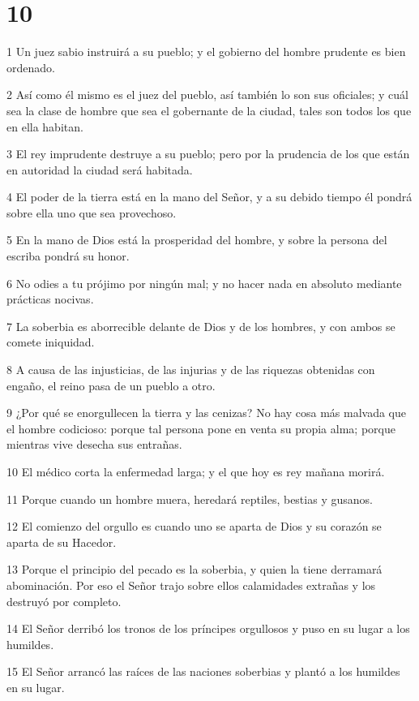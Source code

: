 \chapter{10}

\par 1 Un juez sabio instruirá a su pueblo; y el gobierno del hombre prudente es bien ordenado.
\par 2 Así como él mismo es el juez del pueblo, así también lo son sus oficiales; y cuál sea la clase de hombre que sea el gobernante de la ciudad, tales son todos los que en ella habitan.
\par 3 El rey imprudente destruye a su pueblo; pero por la prudencia de los que están en autoridad la ciudad será habitada.
\par 4 El poder de la tierra está en la mano del Señor, y a su debido tiempo él pondrá sobre ella uno que sea provechoso.
\par 5 En la mano de Dios está la prosperidad del hombre, y sobre la persona del escriba pondrá su honor.
\par 6 No odies a tu prójimo por ningún mal; y no hacer nada en absoluto mediante prácticas nocivas.
\par 7 La soberbia es aborrecible delante de Dios y de los hombres, y con ambos se comete iniquidad.
\par 8 A causa de las injusticias, de las injurias y de las riquezas obtenidas con engaño, el reino pasa de un pueblo a otro.
\par 9 ¿Por qué se enorgullecen la tierra y las cenizas? No hay cosa más malvada que el hombre codicioso: porque tal persona pone en venta su propia alma; porque mientras vive desecha sus entrañas.
\par 10 El médico corta la enfermedad larga; y el que hoy es rey mañana morirá.
\par 11 Porque cuando un hombre muera, heredará reptiles, bestias y gusanos.
\par 12 El comienzo del orgullo es cuando uno se aparta de Dios y su corazón se aparta de su Hacedor.
\par 13 Porque el principio del pecado es la soberbia, y quien la tiene derramará abominación. Por eso el Señor trajo sobre ellos calamidades extrañas y los destruyó por completo.
\par 14 El Señor derribó los tronos de los príncipes orgullosos y puso en su lugar a los humildes.
\par 15 El Señor arrancó las raíces de las naciones soberbias y plantó a los humildes en su lugar.
